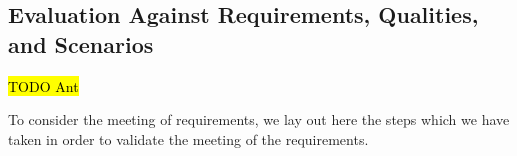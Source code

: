 \documentclass[10pt,a4paper]{article}
\begin{document}
\subsection{Evaluation Against Requirements, Qualities, and Scenarios}
\label{sec:req_eval}
\hl{TODO Ant}



To consider the meeting of requirements, we lay out here the steps which we have taken in order to validate the meeting of the requirements.
\end{document}
